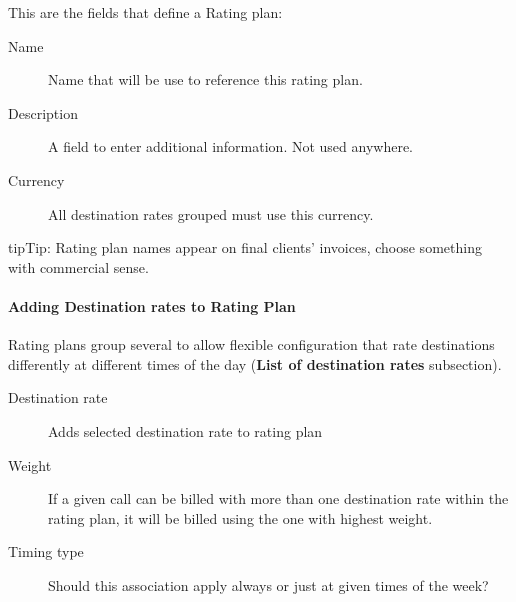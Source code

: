 \documentclass[letterpaper,10pt,english]{sphinxmanual}
\begin{document}
This are the fields that define a Rating plan:
\begin{description}
\item[{Name}] \leavevmode{}\label{administration_portal/brand/billing/rating_plans:term-name}
Name that will be use to reference this rating plan.

\item[{Description}] \leavevmode{}\label{administration_portal/brand/billing/rating_plans:term-description}
A field to enter additional information. Not used anywhere.

\item[{Currency}] \leavevmode{}\label{administration_portal/brand/billing/rating_plans:term-currency}
All destination rates grouped must use this currency.

\end{description}

\begin{notice}{tip}{Tip:}
Rating plan names appear on final clients' invoices, choose something with commercial sense.
\end{notice}


\paragraph{Adding Destination rates to Rating Plan}
\label{administration_portal/brand/billing/rating_plans:adding-destination-rates-to-rating-plan}
Rating plans group several {\hyperref[administration_portal/brand/billing/destination_rates:destination\string-rates]{}} to allow flexible configuration that rate destinations differently
at different times of the day (\textbf{List of destination rates} subsection).
\begin{description}
\item[{Destination rate}] \leavevmode{}\label{administration_portal/brand/billing/rating_plans:term-destination-rate}
Adds selected destination rate to rating plan

\item[{Weight}] \leavevmode{}\label{administration_portal/brand/billing/rating_plans:term-weight}
If a given call can be billed with more than one destination rate within the rating plan,
it will be billed using the one with highest weight.

\item[{Timing type}] \leavevmode{}\label{administration_portal/brand/billing/rating_plans:term-timing-type}
Should this association apply always or just at given times of the week?

\end{description}
\end{document}
